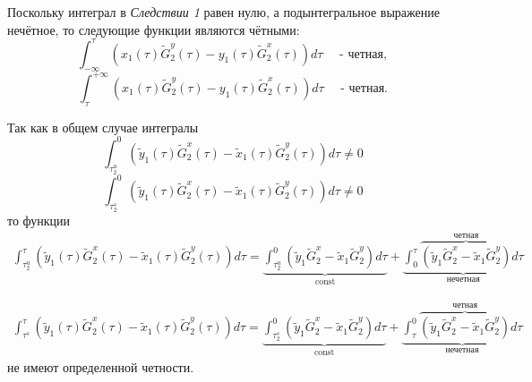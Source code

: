 
Поскольку интеграл в \textit{Следствии 1} равен нулю, а подынтегральное выражение нечётное, то следующие функции являются чётными:
$$\int_{-\infty}^{\tau} \left( x_1(\tau) \tilde G_2^y(\tau) - y_1(\tau) \tilde G_2^x(\tau) \right) d \tau \quad \text{ - четная},$$
$$\int_{\tau}^{+\infty} \left( x_1(\tau) \tilde G_2^y(\tau) - y_1(\tau) \tilde G_2^x(\tau) \right) d \tau \quad \text{ - четная}.$$

Так как в общем случае интегралы
$$\int_{\tau^u_2}^{0} \left( \tilde y_1(\tau) \tilde G_2^x(\tau) - \tilde x_1(\tau) \tilde G_2^y(\tau) \right) d \tau \ne 0$$
$$\int_{\tau^s_2}^{0} \left( \tilde y_1(\tau) \tilde G_2^x(\tau) - \tilde x_1(\tau) \tilde G_2^y(\tau) \right) d \tau \ne 0$$
то функции 
\begin{equation*}
\begin{aligned}
\int_{\tau^u_2}^{\tau} \left( \tilde y_1(\tau) \tilde G_2^x(\tau) - \tilde x_1(\tau) \tilde G_2^y(\tau) \right) d \tau = \underbrace{\int_{\tau^u_2}^{0} \left( \tilde y_1 \tilde G_2^x - \tilde x_1 \tilde G_2^y \right) d \tau}_{\text{const}} + \underbrace{\int_{0}^{\tau} \overbrace{ \left( \tilde y_1 \tilde G_2^x - \tilde x_1 \tilde G_2^y \right)}^{\text{четная}} d \tau}_{\text{нечетная}}
\end{aligned}
\end{equation*}

\begin{equation*}
\begin{aligned}
\int_{\tau^s}^{\tau} \left( \tilde y_1(\tau) \tilde G_2^x(\tau) - \tilde x_1(\tau) \tilde G_2^y(\tau) \right) d \tau = \underbrace{\int_{\tau^s_2}^{0} \left( \tilde y_1 \tilde G_2^x - \tilde x_1 \tilde G_2^y \right) d \tau}_{\text{const}} + \underbrace{\int_{\tau}^{0} \overbrace{ \left( \tilde y_1 \tilde G_2^x - \tilde x_1 \tilde G_2^y \right)}^{\text{четная}} d \tau}_{\text{нечетная}}
\end{aligned}
\end{equation*}
не имеют определенной четности.

